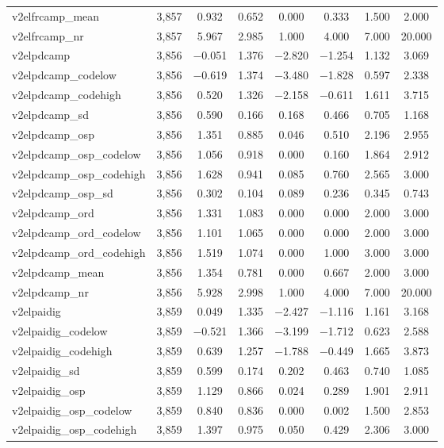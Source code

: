 \begin{table}[!htbp]
\begin{tabular}{@{\extracolsep{5pt}}lccccccc}
v2elfrcamp\_mean & 3,857 & 0.932 & 0.652 & 0.000 & 0.333 & 1.500 & 2.000 \\ 
v2elfrcamp\_nr & 3,857 & 5.967 & 2.985 & 1.000 & 4.000 & 7.000 & 20.000 \\ 
v2elpdcamp & 3,856 & $-$0.051 & 1.376 & $-$2.820 & $-$1.254 & 1.132 & 3.069 \\ 
v2elpdcamp\_codelow & 3,856 & $-$0.619 & 1.374 & $-$3.480 & $-$1.828 & 0.597 & 2.338 \\ 
v2elpdcamp\_codehigh & 3,856 & 0.520 & 1.326 & $-$2.158 & $-$0.611 & 1.611 & 3.715 \\ 
v2elpdcamp\_sd & 3,856 & 0.590 & 0.166 & 0.168 & 0.466 & 0.705 & 1.168 \\ 
v2elpdcamp\_osp & 3,856 & 1.351 & 0.885 & 0.046 & 0.510 & 2.196 & 2.955 \\ 
v2elpdcamp\_osp\_codelow & 3,856 & 1.056 & 0.918 & 0.000 & 0.160 & 1.864 & 2.912 \\ 
v2elpdcamp\_osp\_codehigh & 3,856 & 1.628 & 0.941 & 0.085 & 0.760 & 2.565 & 3.000 \\ 
v2elpdcamp\_osp\_sd & 3,856 & 0.302 & 0.104 & 0.089 & 0.236 & 0.345 & 0.743 \\ 
v2elpdcamp\_ord & 3,856 & 1.331 & 1.083 & 0.000 & 0.000 & 2.000 & 3.000 \\ 
v2elpdcamp\_ord\_codelow & 3,856 & 1.101 & 1.065 & 0.000 & 0.000 & 2.000 & 3.000 \\ 
v2elpdcamp\_ord\_codehigh & 3,856 & 1.519 & 1.074 & 0.000 & 1.000 & 3.000 & 3.000 \\ 
v2elpdcamp\_mean & 3,856 & 1.354 & 0.781 & 0.000 & 0.667 & 2.000 & 3.000 \\ 
v2elpdcamp\_nr & 3,856 & 5.928 & 2.998 & 1.000 & 4.000 & 7.000 & 20.000 \\ 
v2elpaidig & 3,859 & 0.049 & 1.335 & $-$2.427 & $-$1.116 & 1.161 & 3.168 \\ 
v2elpaidig\_codelow & 3,859 & $-$0.521 & 1.366 & $-$3.199 & $-$1.712 & 0.623 & 2.588 \\ 
v2elpaidig\_codehigh & 3,859 & 0.639 & 1.257 & $-$1.788 & $-$0.449 & 1.665 & 3.873 \\ 
v2elpaidig\_sd & 3,859 & 0.599 & 0.174 & 0.202 & 0.463 & 0.740 & 1.085 \\ 
v2elpaidig\_osp & 3,859 & 1.129 & 0.866 & 0.024 & 0.289 & 1.901 & 2.911 \\ 
v2elpaidig\_osp\_codelow & 3,859 & 0.840 & 0.836 & 0.000 & 0.002 & 1.500 & 2.853 \\ 
v2elpaidig\_osp\_codehigh & 3,859 & 1.397 & 0.975 & 0.050 & 0.429 & 2.306 & 3.000 \\ 

\end{tabular}
\end{table}
